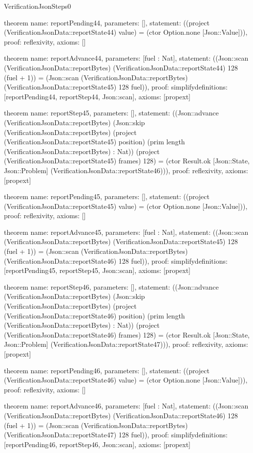 \begin{lexlean}{VerificationJsonSteps0}
\begin{semanticmodule}
theorem{
  name: reportPending44,
  parameters: [],
  statement: ((project (VerificationJsonData::reportState44) value) = (ctor Option.none [Json::Value])),
  proof: reflexivity{},
  axioms: []
}

theorem{
  name: reportAdvance44,
  parameters: [fuel : Nat],
  statement: ((Json::scan (VerificationJsonData::reportBytes) (VerificationJsonData::reportState44) 128 (fuel + 1)) = (Json::scan (VerificationJsonData::reportBytes) (VerificationJsonData::reportState45) 128 fuel)),
  proof: simplify{definitions: [reportPending44, reportStep44, Json::scan]},
  axioms: [propext]
}

theorem{
  name: reportStep45,
  parameters: [],
  statement: ((Json::advance (VerificationJsonData::reportBytes) (Json::skip (VerificationJsonData::reportBytes) (project (VerificationJsonData::reportState45) position) (prim length (VerificationJsonData::reportBytes) : Nat)) (project (VerificationJsonData::reportState45) frames) 128) = (ctor Result.ok [Json::State, Json::Problem] (VerificationJsonData::reportState46))),
  proof: reflexivity{},
  axioms: [propext]
}

theorem{
  name: reportPending45,
  parameters: [],
  statement: ((project (VerificationJsonData::reportState45) value) = (ctor Option.none [Json::Value])),
  proof: reflexivity{},
  axioms: []
}

theorem{
  name: reportAdvance45,
  parameters: [fuel : Nat],
  statement: ((Json::scan (VerificationJsonData::reportBytes) (VerificationJsonData::reportState45) 128 (fuel + 1)) = (Json::scan (VerificationJsonData::reportBytes) (VerificationJsonData::reportState46) 128 fuel)),
  proof: simplify{definitions: [reportPending45, reportStep45, Json::scan]},
  axioms: [propext]
}

theorem{
  name: reportStep46,
  parameters: [],
  statement: ((Json::advance (VerificationJsonData::reportBytes) (Json::skip (VerificationJsonData::reportBytes) (project (VerificationJsonData::reportState46) position) (prim length (VerificationJsonData::reportBytes) : Nat)) (project (VerificationJsonData::reportState46) frames) 128) = (ctor Result.ok [Json::State, Json::Problem] (VerificationJsonData::reportState47))),
  proof: reflexivity{},
  axioms: [propext]
}

theorem{
  name: reportPending46,
  parameters: [],
  statement: ((project (VerificationJsonData::reportState46) value) = (ctor Option.none [Json::Value])),
  proof: reflexivity{},
  axioms: []
}

theorem{
  name: reportAdvance46,
  parameters: [fuel : Nat],
  statement: ((Json::scan (VerificationJsonData::reportBytes) (VerificationJsonData::reportState46) 128 (fuel + 1)) = (Json::scan (VerificationJsonData::reportBytes) (VerificationJsonData::reportState47) 128 fuel)),
  proof: simplify{definitions: [reportPending46, reportStep46, Json::scan]},
  axioms: [propext]
}


\end{semanticmodule}
\end{lexlean}
